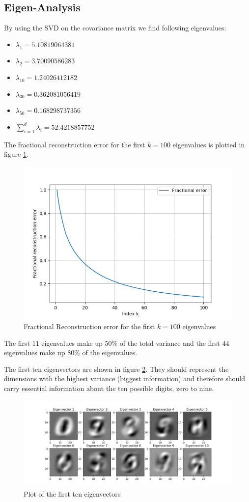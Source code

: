 \documentclass[12pt]{article}
\begin{document}
\subsection{Eigen-Analysis}

By using the SVD on the covariance matrix we find following eigenvalues:
\begin{itemize}
	\item $\lambda_1 = 5.10819064381$
	\item $\lambda_2 = 3.70090586283$
	\item $\lambda_{10} = 1.24026412182$
	\item $\lambda_{30} = 0.362081056419$
	\item $\lambda_{50} = 0.168298737356$
	\item $\sum_{i=1}^{d} \lambda_i = 52.4218857752$
\end{itemize}

The fractional reconstruction error for the first $k=100$ eigenvalues is plotted in figure \ref{fig:4.2.2}.

\begin{figure}
	\centering
	\includegraphics[width=0.66\linewidth]{../Problem_4/Problem_4.2.2.png}
	\caption{Fractional Reconstruction error for the first $k=100$ eigenvalues}
	\label{fig:4.2.2}
\end{figure}

The first $11$ eigenvalues make up $50\%$ of the total variance and the first $44$ eigenvalues make up $80\%$ of the eigenvalues. \par 
The first ten eigenvectors are shown in figure \ref{fig:4.2.4}. They should represent the dimensions with the highest variance (biggest information) and therefore should carry essential information about the ten possible digits, zero to nine.

\begin{figure}
	\centering
	\includegraphics[width=0.66\linewidth]{../Problem_4/Problem_4.2.4.png}
	\caption{Plot of the first ten eigenvectors}
	\label{fig:4.2.4}
\end{figure}
\end{document}

